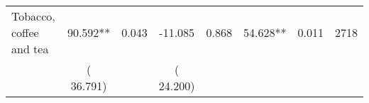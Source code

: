 \begin{tabular}{l*{7}{c}}
 Tobacco, coffee and tea       &             90.592**       &        0.043  &            -11.085       &        0.868  &             54.628**       &              0.011 &  2718 \\ 
                       &       (      36.791)             &                               &       (      24.200)                     &                               &                                               &                                &                      \\ 

\hline \end{tabular}